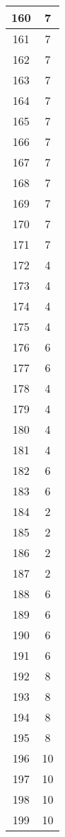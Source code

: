 \documentclass[letterpaper, 12pt]{article}
\begin{document}
\begin{longtable}{|c|c|}
\hline
160 & 7 \\
\hline
161 & 7 \\
\hline
162 & 7 \\
\hline
163 & 7 \\
\hline
164 & 7 \\
\hline
165 & 7 \\
\hline
166 & 7 \\
\hline
167 & 7 \\
\hline
168 & 7 \\
\hline
169 & 7 \\
\hline
170 & 7 \\
\hline
171 & 7 \\
\hline
172 & 4 \\
\hline
173 & 4 \\
\hline
174 & 4 \\
\hline
175 & 4 \\
\hline
176 & 6 \\
\hline
177 & 6 \\
\hline
178 & 4 \\
\hline
179 & 4 \\
\hline
180 & 4 \\
\hline
181 & 4 \\
\hline
182 & 6 \\
\hline
183 & 6 \\
\hline
184 & 2 \\
\hline
185 & 2 \\
\hline
186 & 2 \\
\hline
187 & 2 \\
\hline
188 & 6 \\
\hline
189 & 6 \\
\hline
190 & 6 \\
\hline
191 & 6 \\
\hline
192 & 8 \\
\hline
193 & 8 \\
\hline
194 & 8 \\
\hline
195 & 8 \\
\hline
196 & 10 \\
\hline
197 & 10 \\
\hline
198 & 10 \\
\hline
199 & 10 \\
\hline
\end{longtable}
\end{document}
